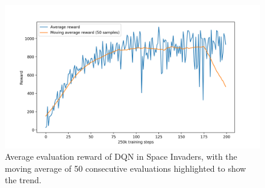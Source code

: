 \begin{figure}
    \includegraphics[width=\textwidth]{pictures/experiments/baseline_space_invaders}
    \centering
    \caption[Average performance of DQN in Space Invaders]{Average evaluation 
	    reward of DQN in Space Invaders, with the moving average of 50 
	    consecutive evaluations highlighted to show the trend.}
    \label{f:SI_baseline}
\end{figure}
%

